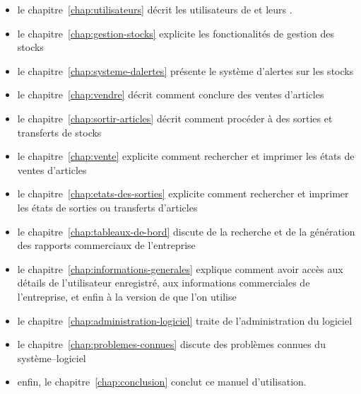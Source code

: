 \begin{itemize}[]
	\item le chapitre~\ref{chap:utilisateurs} d\'ecrit
	les utilisateurs de \yeren et leurs \roles. 
	     
	\item le chapitre~\ref{chap:gestion-stocks} explicite
	les fonctionalit\'es de gestion des stocks
	
	\item le chapitre~\ref{chap:systeme-dalertes}
	pr\'esente le syst\`eme d'alertes sur les stocks
	
	\item le chapitre~\ref{chap:vendre} d\'ecrit comment
	conclure des ventes d'articles
	
	\item le chapitre~\ref{chap:sortir-articles} d\'ecrit
	comment proc\'eder \`a des sorties et transferts de stocks
	
	\item le chapitre~\ref{chap:vente} explicite comment
	rechercher et imprimer les \'etats de ventes d'articles
	
	\item le chapitre~\ref{chap:etats-des-sorties} explicite
	comment rechercher et imprimer les \'etats de sorties ou
	transferts d'articles
	
	\item le chapitre~\ref{chap:tableaux-de-bord} discute
	de la recherche et de la g\'en\'eration des rapports
	commerciaux de l'entreprise
	
	\item le chapitre~\ref{chap:informations-generales}
	explique comment avoir acc\`es aux d\'etails de
	l'utilisateur enregistr\'e, aux informations commerciales
	de l'entreprise, et enfin \`a la version de \yeren que
	l'on utilise
	
	\item le chapitre~\ref{chap:administration-logiciel}
	traite de l'administration du logiciel

	\item le chapitre~\ref{chap:problemes-connues}
	discute des probl\`emes connues du syst\`eme--logiciel
	
	\item enfin, le chapitre~\ref{chap:conclusion} conclut
	ce manuel d'utilisation.
\end{itemize}

